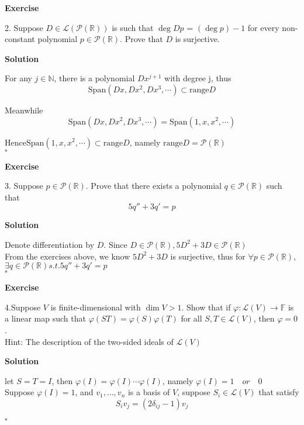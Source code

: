 \documentclass{article}
\newenvironment{exercise}{%
{\textbf{Exercise\\}
    }
}{
}
\newenvironment{solution}{%
{
    \textbf{Solution\\}
    }
}{
  \hfill $\square$ 
  \par\bigskip 
}
\newcommand{\RR}{\mathbb{R}}
\newcommand{\NN}{\mathbb{N}}
\newcommand{\FF}{\mathbb{F}}
\newcommand{\spans}{\text{Span}}
\begin{document}
\begin{CJK}{UTF8}{gkai}
\begin{exercise}
2. Suppose $D \in \mathcal{L}(\mathcal{P}(\RR))$ is such that $\deg Dp$ = $(\deg p) - 1$ for every non-constant polynomial $p \in \mathcal{P}(\RR)$. Prove that $D$ is surjective.\\
\end{exercise}

\begin{solution}
For any $j \in \NN$, there is a polynomial $D x^{j + 1}$ with degree j, thus
\[\spans(Dx,Dx^2,Dx^3,\cdots) \subset \text{range} D\]

Meanwhile \[\spans(Dx,Dx^2,Dx^3,\cdots) = \spans(1,x,x^2,\cdots)\]

Hence$\spans(1,x,x^2,\cdots) \subset \text{range} D$, namely $\text{range} D = \mathcal{P}(\RR)$\\
\end{solution}

\begin{exercise}
3. Suppose $p \in \mathcal{P}(\RR)$. Prove that there exists a polynomial $q \in \mathcal{P}(\RR)$ such
that \[5q'' + 3q' = p\]
\end{exercise}

\begin{solution}
Denote differentiation by $D$. Since $D\in \mathcal{P}(\RR), 5D^2 + 3D \in \mathcal{P}(\RR)$\\

From the exercises above, we know $5D^2 + 3D$ is surjective, thus for $\forall p\in \mathcal{P}(\RR)$, $\exists q \in \mathcal{P}(\RR) s.t. 5 q'' + 3q' = p $\\
\end{solution}

\begin{exercise}
4.Suppose $V$ is finite-dimensional with $\dim V > 1$. Show that if $\varphi:\mathcal{L}(V)\to \FF$ is a linear map such that $\varphi(ST) = \varphi(S)\varphi(T)$ for all $S,T \in \mathcal{L}(V)$, then $\varphi =0$.\\

Hint: The description of the two-sided ideals of $\mathcal{L}(V)$\\
\end{exercise}

\begin{solution}
let $S = T = I$, then $\varphi(I) = \varphi(I) \cdots \varphi(I)$, namely $\varphi(I) = 1\quad or\quad 0$\\

Suppose $\varphi(I) = 1$, and $v_1,\ldots,v_n$ is a basis of $V$, suppose $S_i \in \mathcal{L}(V)$ that satisfy
\[S_i v_j = (2\delta_{ij} - 1) v_j \]


\end{solution}
\end{CJK}
\end{document}
